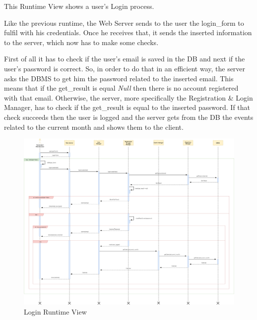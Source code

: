 This Runtime View shows a user's Login process.\par
Like the previous runtime, the Web Server sends to the user the login\_form to fulfil with his credentials. Once he receives that, it sends the inserted information to the server, which now has to make some checks.\par
First of all it has to check if the user’s email is saved in the DB and next if the user’s password is correct. So, in order to do that in an efficient way, the server asks the DBMS to get him the password related to the inserted email. This means that if the get\_result is equal \emph{Null} then there is no account registered with that email. Otherwise, the server, more specifically the Registration \& Login Manager, has to check if the get\_result is equal to the inserted password.
If that check succeeds then the user is logged and the server gets from the DB the events related to the current month and shows them to the client.
\begin{figure}[H]
	\centering
	\includegraphics[scale=0.17]{Images/Runtime/Login}
	\caption{Login Runtime View}
\end{figure}

